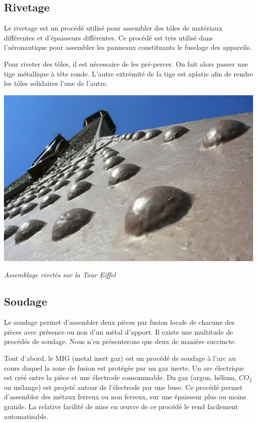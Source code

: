 \documentclass[11pt,oneside]{article}
\begin{document}
\subsection{Rivetage}
\noindent\begin{minipage}[c]{.46\linewidth}
Le rivetage est un procédé utilisé pour assembler des tôles de matériaux différentes et d'épaisseurs différentes. Ce procédé est très utilisé dans l'aéronautique pour assembler les panneaux constituants le fuselage des appareils. 

Pour riveter des tôles, il est nécessaire de les pré-percer. On fait alors passer une tige métallique à tête ronde. L'autre extrémité de la tige est aplatie afin de rendre les tôles solidaires l'une de l'autre. 
\end{minipage}\hfill
\begin{minipage}[c]{.46\linewidth}
\begin{center}
\includegraphics[width=.8\textwidth]{png/rivets}

\textit{Assemblage rivetés sur la Tour Eiffel \cite{rivets}}
\end{center}
\end{minipage}
\subsection{Soudage}

Le soudage permet d'assembler deux pièces par fusion locale de chacune des pièces avec présence ou non d'un métal d'apport. Il existe une multitude de procédés de soudage. Nous n'en présenterons que deux de manière succincte. 

Tout d'abord, le MIG (metal inert gaz) est un procédé de soudage à l'arc au cours duquel la zone de fusion est protégée par un gaz inerte. Un arc électrique est créé entre la pièce et une électrode consommable. Du gaz (argon, hélium, $CO_2$ ou mélange) est projeté autour de l'électrode par une buse. Ce procédé permet d'assembler des métaux ferreux ou non ferreux, sur une épaisseur plus ou moins grande. La relative facilité de mise en œuvre de ce procédé le rend facilement automatisable.
\end{document}

